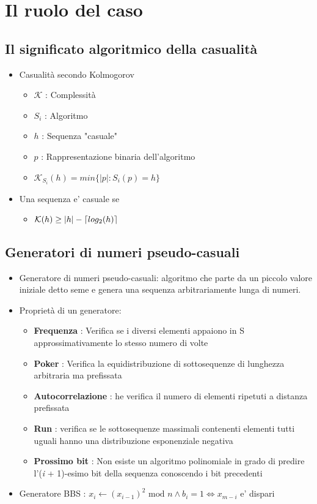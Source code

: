 \chapter{Il ruolo del caso}

\section{Il significato algoritmico della casualità}

\begin{itemize}
    \item Casualità secondo Kolmogorov
    \begin{itemize}
        \item $\mathcal{K}$ : Complessità
        \item $S_i$ : Algoritmo
        \item $h$ : Sequenza "casuale"
        \item $p$ : Rappresentazione binaria dell'algoritmo
        \item $\mathcal{K}_{S_i}(h) = min\{|p| : S_i(p) = h\}$
    \end{itemize}
    \item Una sequenza e' casuale se
    \begin{itemize}
        \item $\mathcal{K}(h) \geq |h| - \lceil log_2(h)\rceil$
    \end{itemize}
\end{itemize}

\section{Generatori di numeri pseudo-casuali}

\begin{itemize}
    \item Generatore di numeri pseudo-casuali: algoritmo che parte da un piccolo valore iniziale detto seme e genera una sequenza arbitrariamente lunga di numeri.
    \item Proprietà di un generatore:
    \begin{itemize}
        \item \textbf{Frequenza} : Verifica se i diversi elementi appaiono in S approssimativamente lo stesso numero di volte
        \item \textbf{Poker} : Verifica la equidistribuzione di sottosequenze di lunghez\-za arbitraria ma prefissata
        \item \textbf{Autocorrelazione} : he verifica il numero di elementi ripetuti a distanza prefissata
        \item \textbf{Run} : verifica se le sottosequenze massimali contenenti elementi tutti uguali hanno una distribuzione esponenziale negativa
        \item \textbf{Prossimo bit} : Non esiste un algoritmo polinomiale in grado di predire l'(\textit{i} + 1)-esimo bit della sequenza conoscendo i bit precedenti
    \end{itemize} 
    \item Generatore BBS : $x_i \leftarrow (x_{i-1})^2 \text{ mod }n \wedge b_i = 1 \Leftrightarrow x_{m-i}$ e' dispari
\end{itemize}

